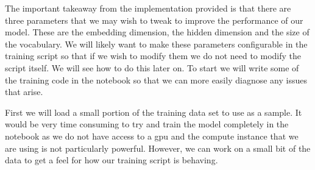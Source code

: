 \documentclass[11pt]{article}
\begin{document}
    The important takeaway from the implementation provided is that there
are three parameters that we may wish to tweak to improve the
performance of our model. These are the embedding dimension, the hidden
dimension and the size of the vocabulary. We will likely want to make
these parameters configurable in the training script so that if we wish
to modify them we do not need to modify the script itself. We will see
how to do this later on. To start we will write some of the training
code in the notebook so that we can more easily diagnose any issues that
arise.

First we will load a small portion of the training data set to use as a
sample. It would be very time consuming to try and train the model
completely in the notebook as we do not have access to a gpu and the
compute instance that we are using is not particularly powerful.
However, we can work on a small bit of the data to get a feel for how
our training script is behaving.
\end{document}
